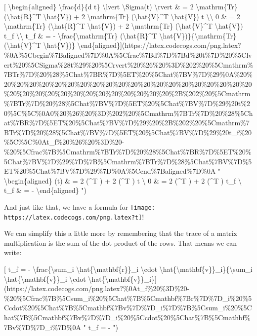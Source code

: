 \documentclass[]{article}
\begin{document}
{[} \textbackslash{}begin\{aligned\} \textbackslash{}frac\{d\}\{d t\}
\textbackslash{}lvert \textbackslash{}Sigma(t) \textbackslash{}rvert \& = 2
\textbackslash{}mathrm\{Tr\} (\textbackslash{}hat\{R\}\^{}T
\textbackslash{}hat\{V\}) + 2 \textbackslash{}mathrm\{Tr\}
(\textbackslash{}hat\{V\}\^{}T \textbackslash{}hat\{V\}) t
\textbackslash{}\textbackslash{} 0 \& = 2 \textbackslash{}mathrm\{Tr\}
(\textbackslash{}hat\{R\}\^{}T \textbackslash{}hat\{V\}) + 2
\textbackslash{}mathrm\{Tr\} (\textbackslash{}hat\{V\}\^{}T
\textbackslash{}hat\{V\}) t\_f \textbackslash{}\textbackslash{} t\_f \& = -
\textbackslash{}frac\{\textbackslash{}mathrm\{Tr\}
(\textbackslash{}hat\{R\}\^{}T
\textbackslash{}hat\{V\})\}\{\textbackslash{}mathrm\{Tr\}(\textbackslash{}hat\{V\}\^{}T
\textbackslash{}hat\{V\})\}
\textbackslash{}end\{aligned\}{]}(https://latex.codecogs.com/png.latex?\%0A\%5Cbegin\%7Baligned\%7D\%0A\%5Cfrac\%7Bd\%7D\%7Bd\%20t\%7D\%20\%5Clvert\%20\%5CSigma\%28t\%29\%20\%5Crvert\%20\%26\%20\%3D\%202\%20\%5Cmathrm\%7BTr\%7D\%20\%28\%5Chat\%7BR\%7D\%5ET\%20\%5Chat\%7BV\%7D\%29\%0A\%20\%20\%20\%20\%20\%20\%20\%20\%20\%20\%20\%20\%20\%20\%20\%20\%20\%20\%20\%20\%20\%20\%20\%20\%20\%20\%20\%20\%20\%20\%20\%20\%20\%20\%2B\%202\%20\%5Cmathrm\%7BTr\%7D\%20\%28\%5Chat\%7BV\%7D\%5ET\%20\%5Chat\%7BV\%7D\%29\%20t\%20\%5C\%5C\%0A0\%20\%26\%20\%3D\%202\%20\%5Cmathrm\%7BTr\%7D\%20\%28\%5Chat\%7BR\%7D\%5ET\%20\%5Chat\%7BV\%7D\%29\%20\%2B\%202\%20\%5Cmathrm\%7BTr\%7D\%20\%28\%5Chat\%7BV\%7D\%5ET\%20\%5Chat\%7BV\%7D\%29\%20t\_f\%20\%5C\%5C\%0At\_f\%20\%26\%20\%3D\%20-\%20\%5Cfrac\%7B\%5Cmathrm\%7BTr\%7D\%20\%28\%5Chat\%7BR\%7D\%5ET\%20\%5Chat\%7BV\%7D\%29\%7D\%7B\%5Cmathrm\%7BTr\%7D\%28\%5Chat\%7BV\%7D\%5ET\%20\%5Chat\%7BV\%7D\%29\%7D\%0A\%5Cend\%7Baligned\%7D\%0A
" \textbackslash{}begin\{aligned\}  \lvert \Sigma(t) \rvert \& = 2
 (\^{}T ) + 2  (\^{}T ) t
\textbackslash{} 0 \& = 2  (\^{}T ) + 2 
(\^{}T ) t\_f \textbackslash{} t\_f \& = -
\textbackslash{}end\{aligned\} ")

And just like that, we have a formula for
\texttt{[image: https://latex.codecogs.com/png.latex?t]}!

We can simplify this a little more by remembering that the trace of a matrix
multiplication is the sum of the dot product of the rows. That means we can
write:

{[} t\_f = - \textbackslash{}frac\{\textbackslash{}sum\_i
\textbackslash{}hat\{\textbackslash{}mathbf\{r\}\}\_i \textbackslash{}cdot
\textbackslash{}hat\{\textbackslash{}mathbf\{v\}\}\_i\}\{\textbackslash{}sum\_i
\textbackslash{}hat\{\textbackslash{}mathbf\{v\}\}\_i \textbackslash{}cdot
\textbackslash{}hat\{\textbackslash{}mathbf\{v\}\}\_i\}{]}(https://latex.codecogs.com/png.latex?\%0At\_f\%20\%3D\%20-\%20\%5Cfrac\%7B\%5Csum\_i\%20\%5Chat\%7B\%5Cmathbf\%7Br\%7D\%7D\_i\%20\%5Ccdot\%20\%5Chat\%7B\%5Cmathbf\%7Bv\%7D\%7D\_i\%7D\%7B\%5Csum\_i\%20\%5Chat\%7B\%5Cmathbf\%7Bv\%7D\%7D\_i\%20\%5Ccdot\%20\%5Chat\%7B\%5Cmathbf\%7Bv\%7D\%7D\_i\%7D\%0A
" t\_f = -
")
\end{document}

